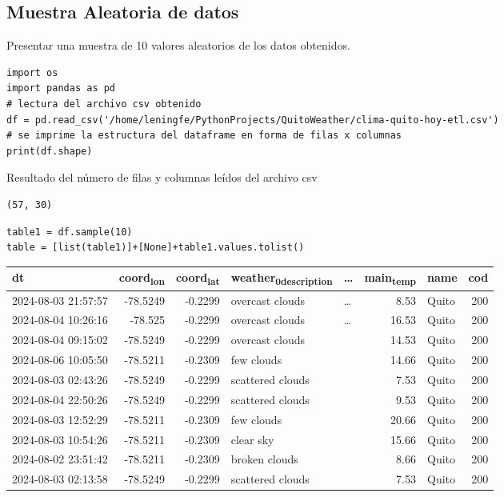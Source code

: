 \documentclass{article}
\begin{document}
\subsection{Muestra Aleatoria de datos}
\label{sec:org37cb3cd}
Presentar una muestra de 10 valores aleatorios de los datos obtenidos.
\begin{verbatim}
import os
import pandas as pd
# lectura del archivo csv obtenido
df = pd.read_csv('/home/leningfe/PythonProjects/QuitoWeather/clima-quito-hoy-etl.csv')
# se imprime la estructura del dataframe en forma de filas x columnas
print(df.shape)
\end{verbatim}

Resultado del número de filas y columnas leídos del archivo csv
\label{orgc35387d}
\begin{verbatim}
(57, 30)
\end{verbatim}

\begin{verbatim}
table1 = df.sample(10)
table = [list(table1)]+[None]+table1.values.tolist()
\end{verbatim}

\begin{center}
\begin{tabular}{lrrllrlr}
dt & coord\textsubscript{lon} & coord\textsubscript{lat} & weather\textsubscript{0}\textsubscript{description} & \ldots{} & main\textsubscript{temp} & name & cod\\
\hline
2024-08-03 21:57:57 & -78.5249 & -0.2299 & overcast clouds & \ldots{} & 8.53 & Quito & 200\\
2024-08-04 10:26:16 & -78.525 & -0.2299 & overcast clouds & \ldots{} & 16.53 & Quito & 200\\
2024-08-04 09:15:02 & -78.5249 & -0.2299 & overcast clouds &  & 14.53 & Quito & 200\\
2024-08-06 10:05:50 & -78.5211 & -0.2309 & few clouds &  & 14.66 & Quito & 200\\
2024-08-03 02:43:26 & -78.5249 & -0.2299 & scattered clouds &  & 7.53 & Quito & 200\\
2024-08-04 22:50:26 & -78.5249 & -0.2299 & scattered clouds &  & 9.53 & Quito & 200\\
2024-08-03 12:52:29 & -78.5211 & -0.2309 & few clouds &  & 20.66 & Quito & 200\\
2024-08-03 10:54:26 & -78.5211 & -0.2309 & clear sky &  & 15.66 & Quito & 200\\
2024-08-02 23:51:42 & -78.5211 & -0.2309 & broken clouds &  & 8.66 & Quito & 200\\
2024-08-03 02:13:58 & -78.5249 & -0.2299 & scattered clouds &  & 7.53 & Quito & 200\\
\end{tabular}
\end{center}
\end{document}
